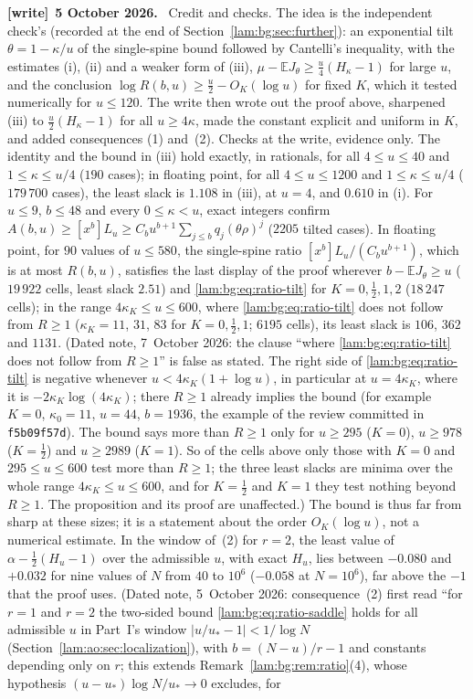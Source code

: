 \documentclass[11pt,a4paper]{article}
\numberwithin{equation}{section}
\theoremstyle{remark}
\newcommand{\E}{\mathbb E}
\newenvironment{writenote}[1][]{\par\smallskip\begingroup\small
 \noindent\textbf{[write]}\if\relax\detokenize{#1}\relax\else~\textbf{#1.}\fi\ }%
 {\par\endgroup\smallskip}
\begin{document}
\begin{writenote}[5 October 2026]
Credit and checks. The idea is the independent check's (recorded at the end of Section~\ref{lam:bg:sec:further}): an exponential tilt $\theta=1-\kappa/u$ of the single-spine bound followed by Cantelli's inequality, with the estimates (i), (ii) and a weaker form of (iii), $\mu-\E J_\theta\ge\frac u4(H_\kappa-1)$ for large $u$, and the conclusion $\log R(b,u)\ge\frac u2-O_K(\log u)$ for fixed $K$, which it tested numerically for $u\le120$. The write then wrote out the proof above, sharpened (iii) to $\frac u2(H_\kappa-1)$ for all $u\ge4\kappa$, made the constant explicit and uniform in $K$, and added consequences (1) and~(2). Checks at the write, evidence only. The identity and the bound in (iii) hold exactly, in rationals, for all $4\le u\le40$ and $1\le\kappa\le u/4$ ($190$ cases); in floating point, for all $4\le u\le1200$ and $1\le\kappa\le u/4$ ($179\,700$ cases), the least slack is $1.108$ in (iii), at $u=4$, and $0.610$ in (i). For $u\le9$, $b\le48$ and every $0\le\kappa<u$, exact integers confirm $A(b,u)\ge[x^b]L_u\ge C_bu^{b+1}\sum_{j\le b}q_j(\theta\rho)^j$ ($2205$ tilted cases). In floating point, for $90$ values of $u\le580$, the single-spine ratio $[x^b]L_u/(C_bu^{b+1})$, which is at most $R(b,u)$, satisfies the last display of the proof wherever $b-\E J_\theta\ge u$ ($19\,922$ cells, least slack $2.51$) and \eqref{lam:bg:eq:ratio-tilt} for $K=0,\frac12,1,2$ ($18\,247$ cells); in the range $4\kappa_K\le u\le600$, where \eqref{lam:bg:eq:ratio-tilt} does not follow from $R\ge1$ ($\kappa_K=11$, $31$, $83$ for $K=0,\frac12,1$; $6195$ cells), its least slack is $106$, $362$ and $1131$. (Dated note, 7~October 2026: the clause ``where \eqref{lam:bg:eq:ratio-tilt} does not follow from $R\ge1$'' is false as stated. The right side of \eqref{lam:bg:eq:ratio-tilt} is negative whenever $u<4\kappa_K(1+\log u)$, in particular at $u=4\kappa_K$, where it is $-2\kappa_K\log(4\kappa_K)$; there $R\ge1$ already implies the bound (for example $K=0$, $\kappa_0=11$, $u=44$, $b=1936$, the example of the review committed in \texttt{f5b09f57d}). The bound says more than $R\ge1$ only for $u\ge295$ ($K=0$), $u\ge978$ ($K=\frac12$) and $u\ge2989$ ($K=1$). So of the cells above only those with $K=0$ and $295\le u\le600$ test more than $R\ge1$; the three least slacks are minima over the whole range $4\kappa_K\le u\le600$, and for $K=\frac12$ and $K=1$ they test nothing beyond $R\ge1$. The proposition and its proof are unaffected.) The bound is thus far from sharp at these sizes; it is a statement about the order $O_K(\log u)$, not a numerical estimate. In the window of~(2) for $r=2$, the least value of $\alpha-\frac12(H_u-1)$ over the admissible $u$, with exact $H_u$, lies between $-0.080$ and $+0.032$ for nine values of $N$ from $40$ to $10^6$ ($-0.058$ at $N=10^6$), far above the $-1$ that the proof uses. (Dated note, 5~October 2026: consequence~(2) first read ``for $r=1$ and $r=2$ the two-sided bound \eqref{lam:bg:eq:ratio-saddle} holds for all admissible $u$ in Part~I's window $|u/u_*-1|<1/\log N$ (Section~\ref{lam:ao:sec:localization}), with $b=(N-u)/r-1$ and constants depending only on $r$; this extends Remark~\ref{lam:bg:rem:ratio}(4), whose hypothesis $(u-u_*)\log N/u_*\to0$ excludes, for 
\end{writenote}
\end{document}

